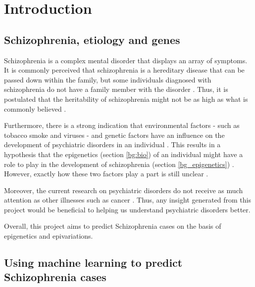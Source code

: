 \documentclass[12pt, twoside, a4paper]{report}
\begin{document}
\tableofcontents

\newpage


\chapter{Introduction}


\section{Schizophrenia, etiology and genes}

Schizophrenia is a complex mental disorder that displays an array of symptoms. It is commonly perceived that schizophrenia is a hereditary disease that can be passed down within the family, but some individuals diagnosed with schizophrenia do not have a family member with the disorder \cite{RefWorks:8}. Thus, it is postulated that the heritability of schizophrenia might not be as high as what is commonly believed \cite{RefWorks:9}.

Furthermore, there is a strong indication that environmental factors - such as tobacco smoke and viruses - and genetic factors have an influence on the development of psychiatric disorders in an individual \cite{RefWorks:8, RefWorks:10}. This results in a hypothesis that the epigenetics (section \ref{bg:bio}) of an individual might have a role to play in the development of schizophrenia (section \ref{bg_epigenetics}) \cite{RefWorks:12}. However, exactly how these two factors play a part is still unclear \cite{RefWorks:11}.

Moreover, the current research on psychiatric disorders do not receive as much attention as other illnesses such as cancer \cite{RefWorks:82}. Thus, any insight generated from this project would be beneficial to helping us understand psychiatric disorders better.

Overall, this project aims to predict Schizophrenia cases on the basis of epigenetics and epivariations.


\section{Using machine learning to predict Schizophrenia cases} \label{intro_ML}
\end{document}
